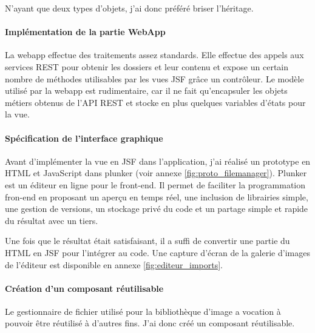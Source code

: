 N'ayant que deux types d'objets, j'ai donc préféré briser l'héritage.


\paragraph*{Implémentation de la partie WebApp\\}
La webapp effectue des traitements assez standards. Elle effectue des appels aux services REST pour obtenir les dossiers et leur contenu et expose un certain nombre de méthodes utilisables par les vues JSF grâce un contrôleur.
Le modèle utilisé par la webapp est rudimentaire, car il ne fait qu'encapsuler les objets métiers obtenus de l'API REST et stocke en plus quelques variables d'états pour la vue.

\paragraph*{Spécification de l'interface graphique\\}
Avant d'implémenter la vue en JSF dans l'application, j'ai réalisé un prototype en HTML et JavaScript dans plunker (voir annexe \ref{fig:proto_filemanager}).
Plunker est un éditeur en ligne pour le front-end. Il permet de faciliter la programmation fron-end en proposant un aperçu en temps réel, une inclusion de librairies simple, une gestion de versions, un stockage privé du code et un partage simple et rapide du résultat avec un tiers.

Une fois que le résultat était satisfaisant, il a suffi de convertir une partie du HTML en JSF pour l'intégrer au code.
Une capture d'écran de la galerie d'images de l'éditeur est disponible en annexe \ref{fig:editeur_imports}.

\paragraph*{Création d'un composant réutilisable\\}
Le gestionnaire de fichier utilisé pour la bibliothèque d'image a vocation à pouvoir être réutilisé à d'autres fins.
J'ai donc créé un composant réutilisable.

